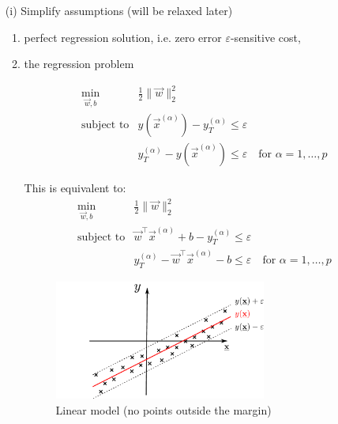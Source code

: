 \begin{frame}\frametitle{\subsubsecname}

\begin{itemize}
\item[(i)]
Simplify assumptions (will be relaxed later)
\begin{enumerate}
    \item perfect regression solution, i.e. zero error $\varepsilon$-sensitive cost,
    \item the regression problem

        \begin{equation}
        \begin{array}{ll}
        \min_{\vec w, b} & \frac{1}{2} \lVert \vec w \rVert_{2}^{2}\\
        \text{subject to} & 
        y(\vec x^{(\alpha)}) - y_{T}^{(\alpha)} \le \varepsilon\\
        &
        y_{T}^{(\alpha)} - y(\vec x^{(\alpha)}) \le \varepsilon \quad \text{for }\alpha=1,\ldots,p
        \end{array}
        \end{equation}  
        
        This is equivalent to:\\

        \begin{equation}
        \begin{array}{ll}
        \min_{\vec w, b} & \frac{1}{2} \lVert \vec w \rVert_{2}^{2}\\
        \text{subject to} & 
        \vec w^{\top} \vec x^{(\alpha)} + b - y_{T}^{(\alpha)} \le \varepsilon\\
        &
        y_{T}^{(\alpha)} - \vec w^{\top} \vec x^{(\alpha)} - b \le \varepsilon \quad \text{for }\alpha=1,\ldots,p
        \end{array}
        \end{equation}  
        
        \begin{figure}[h]
     \centering
	 \includegraphics[width=0.7\textwidth]{img/regression_1d_linear_margin}%
     \caption{Linear model (no points outside the margin)}
	 \label{fig:model_margin}
\end{figure}


\end{enumerate}
\end{itemize}
    
\end{frame}
